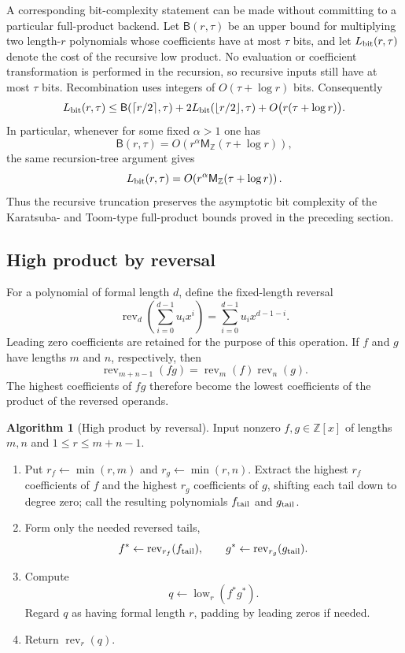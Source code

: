 \documentclass[11pt]{book}
\theoremstyle{definition}
\newtheorem{algorithm}[theorem]{Algorithm}
\newcommand{\ZZ}{\mathbb Z}
\newcommand{\MZ}{\mathsf M_{\ZZ}}
\begin{document}
A corresponding bit-complexity statement can be made without committing to a
particular full-product backend.  Let $\mathsf B(r,\tau)$ be an upper bound for
multiplying two length-$r$ polynomials whose coefficients have at most $\tau$
bits, and let $L_{\rm bit}(r,\tau)$ denote the cost of the recursive low
product.  No evaluation or coefficient transformation is performed in the
recursion, so recursive inputs still have at most $\tau$ bits.  Recombination
uses integers of $O(\tau+\log r)$ bits.  Consequently
\begin{equation}\label{eq:low-bit-recurrence}
 L_{\rm bit}(r,\tau)
 \leq
 \mathsf B(\lceil r/2\rceil,\tau)
 +2L_{\rm bit}(\lfloor r/2\rfloor,\tau)
 +O\bigl(r(\tau+\log r)\bigr).
\end{equation}
In particular, whenever for some fixed $\alpha>1$ one has
\[
 \mathsf B(r,\tau)
 =O\!\left(r^\alpha\MZ(\tau+\log r)\right),
\]
the same recursion-tree argument gives
\[
 L_{\rm bit}(r,\tau)
 =O\!\left(r^\alpha\MZ(\tau+\log r)\right).
\]
Thus the recursive truncation preserves the asymptotic bit complexity of the
Karatsuba- and Toom-type full-product bounds proved in the preceding section.

\subsection{High product by reversal}

For a polynomial of formal length $d$, define the fixed-length reversal
\[
 \operatorname{rev}_d\!\left(\sum_{i=0}^{d-1}u_ix^i\right)
 =\sum_{i=0}^{d-1}u_i x^{d-1-i}.
\]
Leading zero coefficients are retained for the purpose of this operation.
If $f$ and $g$ have lengths $m$ and $n$, respectively, then
\begin{equation}\label{eq:reversal-product-identity}
 \operatorname{rev}_{m+n-1}(fg)
 =\operatorname{rev}_m(f)\operatorname{rev}_n(g).
\end{equation}
The highest coefficients of $fg$ therefore become the lowest coefficients of
the product of the reversed operands.

\begin{algorithm}[High product by reversal]\label{alg:high-by-reversal}
Input nonzero $f,g\in\ZZ[x]$ of lengths $m,n$ and
$1\leq r\leq m+n-1$.
\begin{enumerate}
 \item Put $r_f\leftarrow\min(r,m)$ and $r_g\leftarrow\min(r,n)$.
 Extract the highest $r_f$ coefficients of $f$ and the highest $r_g$
 coefficients of $g$, shifting each tail down to degree zero; call the
 resulting polynomials $f_{\rm tail}$ and $g_{\rm tail}$.
 \item Form only the needed reversed tails,
 \[
    f^*\leftarrow\operatorname{rev}_{r_f}(f_{\rm tail}),
    \qquad
    g^*\leftarrow\operatorname{rev}_{r_g}(g_{\rm tail}).
 \]
 \item Compute
 \[
    q\leftarrow\operatorname{low}_r(f^*g^*).
 \]
 Regard $q$ as having formal length $r$, padding by leading zeros if needed.
 \item Return $\operatorname{rev}_r(q)$.
\end{enumerate}
\end{algorithm}
\end{document}
